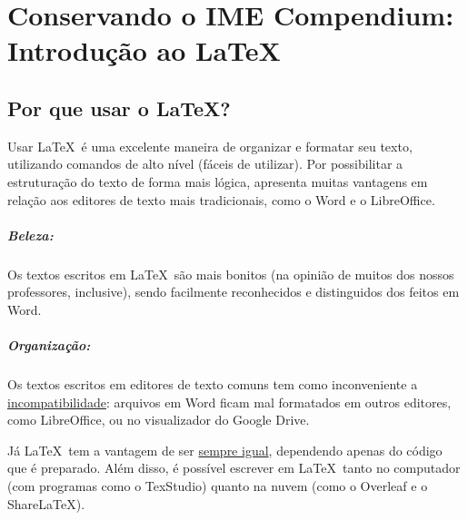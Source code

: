 \documentclass[12pt,a4paper]{article}
\begin{document}
\newpage
\section{Conservando o IME Compendium: Introdução ao \LaTeX}

\subsection{Por que usar o \LaTeX?}

Usar \LaTeX \, é uma excelente maneira de organizar e formatar seu texto, utilizando comandos de alto nível (fáceis de utilizar). Por possibilitar a estruturação do texto de forma mais lógica, apresenta muitas vantagens em relação aos editores de texto mais tradicionais, como o Word e o LibreOffice.

\subparagraph{Beleza:} Os textos escritos em \LaTeX \, são mais bonitos (na opinião de muitos dos nossos professores, inclusive), sendo facilmente reconhecidos e distinguidos dos feitos em Word.

\subparagraph{Organização:} Os textos escritos em editores de texto comuns tem como inconveniente a \underline{incompatibilidade}: arquivos em Word ficam mal formatados em outros editores, como LibreOffice, ou no visualizador do Google Drive.

Já \LaTeX \, tem a vantagem de ser \underline{sempre igual}, dependendo apenas do código que é preparado. Além disso, é possível escrever em \LaTeX \, tanto no computador (com programas como o TexStudio) quanto na nuvem (como o Overleaf e o ShareLaTeX).
\end{document}
